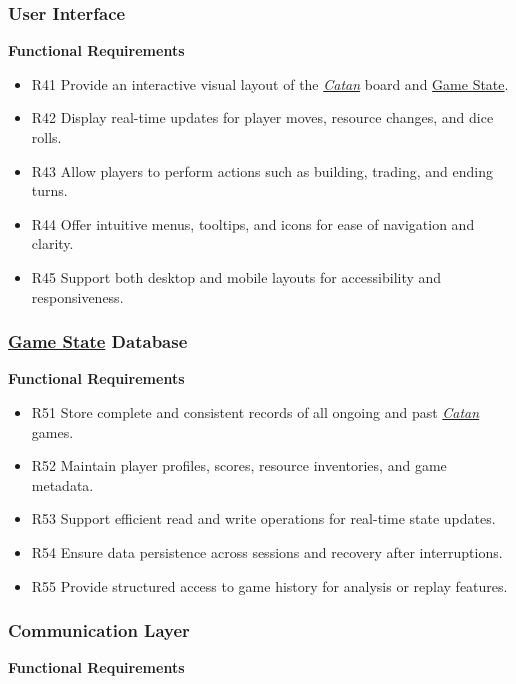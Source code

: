\documentclass{article}
\newcommand{\Catan}{\href{https://en.wikipedia.org/wiki/Catan}{Catan}}
\newcommand{\GameState}{\href{https://milvus.io/ai-quick-reference/what-is-a-state-in-rl}{Game State}}
\begin{document}
\subsubsection{User Interface}

\textbf{Functional Requirements}

\begin{itemize}
  \item R41 Provide an interactive visual layout of the \emph{\Catan{}} board and \GameState{}.
  \item R42 Display real-time updates for player moves, resource changes, and dice rolls.
  \item R43 Allow players to perform actions such as building, trading, and ending turns.
  \item R44 Offer intuitive menus, tooltips, and icons for ease of navigation and clarity.
  \item R45 Support both desktop and mobile layouts for accessibility and responsiveness.

\end{itemize}

\subsubsection{\GameState{} Database}

\textbf{Functional Requirements}

\begin{itemize}
  \item R51 Store complete and consistent records of all ongoing and past \emph{\Catan{}} games.
  \item R52 Maintain player profiles, scores, resource inventories, and game metadata.
  \item R53 Support efficient read and write operations for real-time state updates.
  \item R54 Ensure data persistence across sessions and recovery after interruptions.
  \item R55 Provide structured access to game history for analysis or replay features.

\end{itemize}

\subsubsection{Communication Layer}

\textbf{Functional Requirements}
\end{document}
